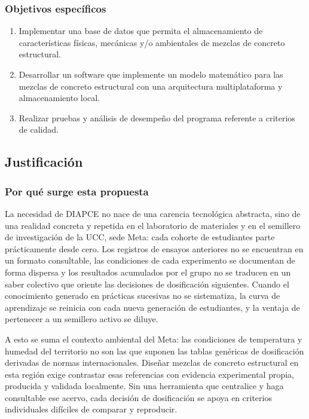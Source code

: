 \subsubsection{Objetivos específicos}
\begin{enumerate}
    \item Implementar una base de datos que permita el almacenamiento de características físicas, mecánicas y/o ambientales de mezclas de concreto estructural.
    \item Desarrollar un software que implemente un modelo matemático para las mezclas de concreto estructural con una arquitectura multiplataforma y almacenamiento local.
    \item Realizar pruebas y análisis de desempeño del programa referente a criterios de calidad.
\end{enumerate}

\subsection{Justificación}

\subsubsection*{Por qué surge esta propuesta}

La necesidad de DIAPCE no nace de una carencia tecnológica abstracta, sino de una realidad concreta y repetida en el laboratorio de materiales y en el semillero de investigación de la UCC, sede Meta: cada cohorte de estudiantes parte prácticamente desde cero. Los registros de ensayos anteriores no se encuentran en un formato consultable, las condiciones de cada experimento se documentan de forma dispersa y los resultados acumulados por el grupo no se traducen en un saber colectivo que oriente las decisiones de dosificación siguientes. Cuando el conocimiento generado en prácticas sucesivas no se sistematiza, la curva de aprendizaje se reinicia con cada nueva generación de estudiantes, y la ventaja de pertenecer a un semillero activo se diluye.

A esto se suma el contexto ambiental del Meta: las condiciones de temperatura y humedad del territorio no son las que suponen las tablas genéricas de dosificación derivadas de normas internacionales. Diseñar mezclas de concreto estructural en esta región exige contrastar esas referencias con evidencia experimental propia, producida y validada localmente. Sin una herramienta que centralice y haga consultable ese acervo, cada decisión de dosificación se apoya en criterios individuales difíciles de comparar y reproducir.


